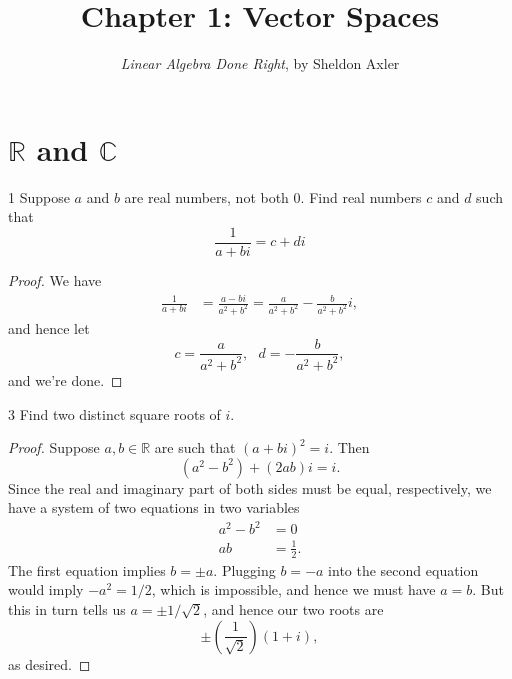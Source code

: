\documentclass{extarticle}
\title{\vspace{-2em}Chapter 1: Vector Spaces}
\author{\emph{Linear Algebra Done Right}, by Sheldon Axler}
\date{}
\newenvironment{problem}[1]{\begin{prob*}{#1}{}}{\end{prob*}}
\newcommand{\R}{\mathbb{R}}
\newcommand{\C}{\mathbb{C}}
\begin{document}
\maketitle



\section{$\R$ and $\C$}

\begin{problem}{1}
Suppose $a$ and $b$ are real numbers, not both $0$.  Find real numbers $c$ and $d$ such that 
\begin{equation*}
\frac{1}{a+bi}=c+di
\end{equation*}
\end{problem}
\begin{proof}
We have
\begin{align*}
\frac{1}{a+bi} &= \frac{a-bi}{a^2+b^2} = \frac{a}{a^2+b^2} - \frac{b}{a^2+b^2}i,
\end{align*}
and hence let
\begin{equation*}
c = \frac{a}{a^2+b^2}, ~~~ d = - \frac{b}{a^2+b^2},
\end{equation*}
and we're done.
\end{proof}

\begin{problem}{3}
Find two distinct square roots of $i$.
\end{problem}
\begin{proof}
Suppose $a,b\in\R$ are such that $(a+bi)^2 = i$.  Then
\begin{equation*}
(a^2 - b^2) + (2ab)i= i.
\end{equation*}
Since the real and imaginary part of both sides must be equal, respectively, we have a system of two equations in two variables
\begin{align*}
a^2 -b^2&= 0\\
ab &= \frac{1}{2}.
\end{align*}
The first equation implies $b=\pm a$.  Plugging $b=-a$ into the second equation would imply $-a^2 = 1/2$, which is impossible, and hence we must have $a=b$.  But this in turn tells us $a=\pm 1/\sqrt{2}$, and hence our two roots are
\begin{equation*}
\pm\left(\frac{1}{\sqrt{2}}\right)(1+i),
\end{equation*}
as desired.
\end{proof}
\end{document}
